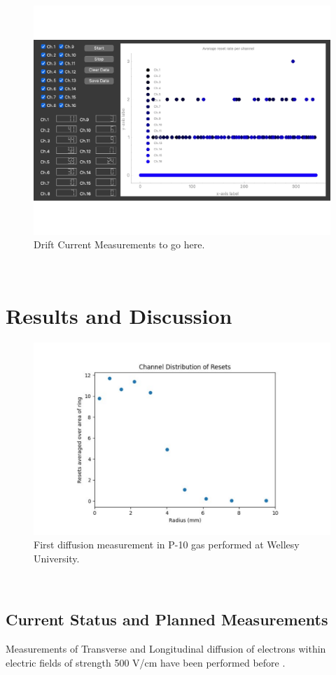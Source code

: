 \begin{figure}[]
\centering
\includegraphics[width=\textwidth]{images/SAQ_gui_resets.pdf}
\caption{Drift Current Measurements to go here.}
\end{figure}~\label{fig:saq_drift_gui}

\section{Results and Discussion}

\begin{figure}[]
\centering
\includegraphics[width=\textwidth]{images/SAQ_first_diffusion_measurement.pdf}
\caption{First diffusion measurement in P-10 gas performed at Wellesy University.}
\end{figure}~\label{fig:saq_first_diffusion_measurement}

\subsection{Current Status and Planned Measurements}

Measurements of Transverse and Longitudinal diffusion of electrons within electric fields of strength 500 V/cm have been performed before \citep{lar_diffusion_measurement_LI2016160}.
